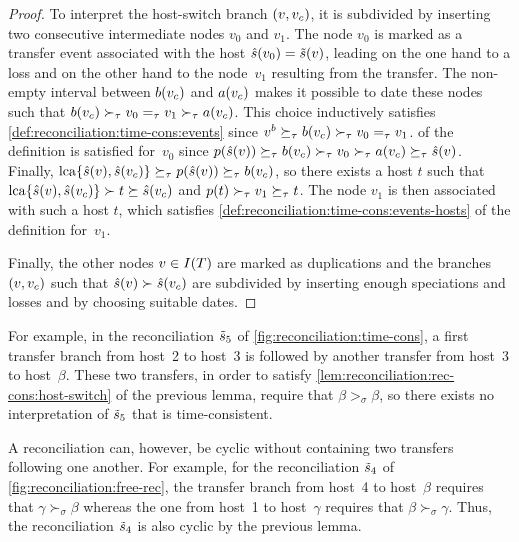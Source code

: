 \begin{proof}
    To interpret the host-switch branch \((v, v_c)\),
    it is subdivided by inserting two consecutive intermediate nodes \(v_0\) and \(v_1\).
    The node \(v_0\) is marked as a transfer event associated with the host \(\hat{s}(v_0) = \tilde{s}(v)\), leading on the one hand to a loss and on the other hand to the node~\(v_1\) resulting from the transfer.
    The non-empty interval between \(b(v_c)\) and \(a(v_c)\) makes it possible to date these nodes such that \(b(v_c) \succ_\tau v_0 =_\tau v_1 \succ_\tau a(v_c)\).
    This choice inductively satisfies \cref{def:reconciliation:time-cons:events} since \(v^b \succeq_\tau b(v_c) \succ_\tau v_0 =_\tau v_1\).
     of the definition is satisfied for~\(v_0\) since \(p(\hat{s}(v)) \succeq_\tau b(v_c) \succ_\tau v_0 \succ_\tau a(v_c) \succeq_\tau \hat{s}(v)\).
    Finally, \(\mathrm{lca}\{\hat{s}(v), \hat{s}(v_c)\} \succeq_\tau p(\hat{s}(v)) \succeq_\tau b(v_c)\), so there exists a host \(t\) such that \(\mathrm{lca}\{\hat{s}(v), \hat{s}(v_c)\} \succ t \succeq \hat{s}(v_c)\) and \(p(t) \succ_\tau v_1 \succeq_\tau t\).
    The node \(v_1\) is then associated with such a host \(t\), which satisfies \cref{def:reconciliation:time-cons:events-hosts} of the definition for~\(v_1\).

    Finally, the other nodes \(v \in I(T)\) are marked as duplications and the branches \((v, v_c)\) such that \(\hat{s}(v) \succ \hat{s}(v_c)\) are subdivided by inserting enough speciations and losses and by choosing suitable dates.
\end{proof}

For example, in the reconciliation \(\tilde{s}_5\) of \cref{fig:reconciliation:time-cons}, a first transfer branch from host~2 to host~3 is followed by another transfer from host~3 to host~\(\beta\).
These two transfers, in order to satisfy \cref{lem:reconciliation:rec-cons:host-switch} of the previous lemma, require that \(\beta >_\sigma \beta\), so there exists no interpretation of \(\tilde{s}_5\) that is time-consistent.

A reconciliation can, however, be cyclic without containing two transfers following one another.
For example, for the reconciliation \(\tilde{s}_4\) of \cref{fig:reconciliation:free-rec}, the transfer branch from host~4 to host~\(\beta\) requires that \(\gamma \succ_\sigma \beta\) whereas the one from host~1 to host~\(\gamma\) requires that \(\beta \succ_\sigma \gamma\).
Thus, the reconciliation \(\tilde{s}_4\) is also cyclic by the previous lemma.

